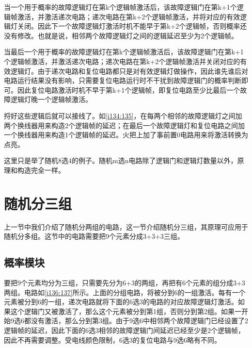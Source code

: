 当一个用于概率的故障逻辑灯在第k个逻辑帧激活后，该故障逻辑门在第k+1个逻辑帧激活，并激活递次电路；递次电路在第k+2个逻辑帧激活，并将对应的有效逻辑灯关闭。因此下一个故障逻辑灯激活时机不能早于第k+2个逻辑帧，否则概率还没有修改。也就是说，相邻两个故障逻辑灯之间的逻辑延迟至少为2个逻辑帧。

当最后一个用于概率的故障逻辑灯在第k个逻辑帧激活后，该故障逻辑门在第k+1个逻辑帧激活，并激活递次电路；递次电路在第k+2个逻辑帧激活并关闭对应的有效逻辑灯。由于递次电路和复位电路都只是对有效逻辑灯做操作，因此谁先谁后对电路运行结果没有影响，只需要复位电路运行时不干扰到故障逻辑门的概率判断即可。因此复位电路激活时机不早于第k+1个逻辑帧，即复位电路至少比最后一个故障逻辑灯晚一个逻辑帧激活。

捋好这些逻辑后就可以接线了。如\autoref{i134:135}，在每两个相邻的故障逻辑灯之间加两个换线器用来构造2个逻辑帧的延迟；在最后一个故障逻辑灯和复位电路之间加一个换线器用来构造1个逻辑帧的延迟。火把上加了事前置0电路用来将激活转换为点亮。

\begin{figure}[!ht]
  \centering
  \caption{}
  \label{i134:135}
\end{figure}

这里只是举了随机8选4的例子。随机m选n电路除了逻辑门和逻辑灯数量以外，原理和构造完全一样。

\section{随机分三组}

上一节中我们介绍了随机分两组的电路，这一节介绍随机分三组，其原理可应用于随机分多组。这节中的电路需要把9个元素分成3+3+3三组。

\subsection{概率模块}

要把9个元素均分为三组，只需要先分为6+3的两组，再把有6个元素的组分成3+3两组。电路如\autoref{i136:137}所示。上面的分组电路，将被分到6的一组激活。每有一个元素被分到6的一组，递次电路就将下面的6选3的电路的对应故障逻辑灯激活。如果这个逻辑门又被激活了，那么这个元素被分到第1组，否则分到第2组。如果一开始9选6都没有激活，那么分到第3组。由于9选6中相邻两个故障逻辑门已经设置了2逻辑帧的延迟，因此下面的6选3相邻的故障逻辑门间延迟已经至少是2个逻辑帧，因此不再需要调整。受电线颜色限制，6选3的复位电路与9选6略有不同。

\begin{figure}[!ht]
  \centering
  \caption{}
  \label{i136:137}
\end{figure}

